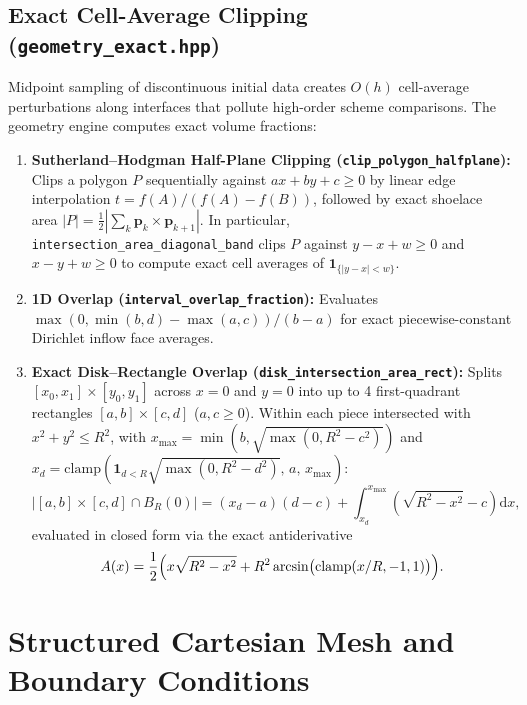 \documentclass[11pt,a4paper]{article}
\theoremstyle{definition}
\newcommand{\dd}{\mathrm{d}}
\newcommand{\abs}[1]{\left\lvert #1 \right\rvert}
\newcommand{\code}[1]{\texttt{#1}}
\begin{document}
\subsection{Exact Cell-Average Clipping (\code{geometry\_exact.hpp})}

Midpoint sampling of discontinuous initial data creates $O(h)$ cell-average perturbations along interfaces that pollute high-order scheme comparisons. The geometry engine computes exact volume fractions:
\begin{enumerate}
\item \textbf{Sutherland--Hodgman Half-Plane Clipping (\code{clip\_polygon\_halfplane}):} Clips a polygon $P$ sequentially against $ax + by + c \ge 0$ by linear edge interpolation $t = f(A)/(f(A)-f(B))$, followed by exact shoelace area $|P| = \frac{1}{2}\abs{\sum_k \mathbf{p}_k \times \mathbf{p}_{k+1}}$. In particular, \code{intersection\_area\_diagonal\_band} clips $P$ against $y - x + w \ge 0$ and $x - y + w \ge 0$ to compute exact cell averages of $\mathbf{1}_{\{|y-x| < w\}}$.
\item \textbf{1D Overlap (\code{interval\_overlap\_fraction}):} Evaluates $\max(0, \min(b,d)-\max(a,c))/(b-a)$ for exact piecewise-constant Dirichlet inflow face averages.
\item \textbf{Exact Disk--Rectangle Overlap (\code{disk\_intersection\_area\_rect}):} Splits $[x_0,x_1]\times[y_0,y_1]$ across $x=0$ and $y=0$ into up to 4 first-quadrant rectangles $[a,b]\times[c,d]$ ($a,c\ge 0$). Within each piece intersected with $x^2+y^2\le R^2$, with $x_{\max} = \min(b,\sqrt{\max(0,R^2-c^2)})$ and $x_d = \mathrm{clamp}(\mathbf{1}_{d<R}\sqrt{\max(0,R^2-d^2)},\, a,\, x_{\max})$:
\[
|{[a,b]\times[c,d]}\cap B_R(0)| = (x_d - a)(d - c) + \int_{x_d}^{x_{\max}} \left(\sqrt{R^2-x^2} - c\right)\dd x,
\]
evaluated in closed form via the exact antiderivative
\[
A(x) = \frac{1}{2}\Bigl(x\sqrt{R^2-x^2} + R^2\arcsin\bigl(\mathrm{clamp}(x/R,-1,1)\bigr)\Bigr).
\]
\end{enumerate}

\section{Structured Cartesian Mesh and Boundary Conditions}
\end{document}
